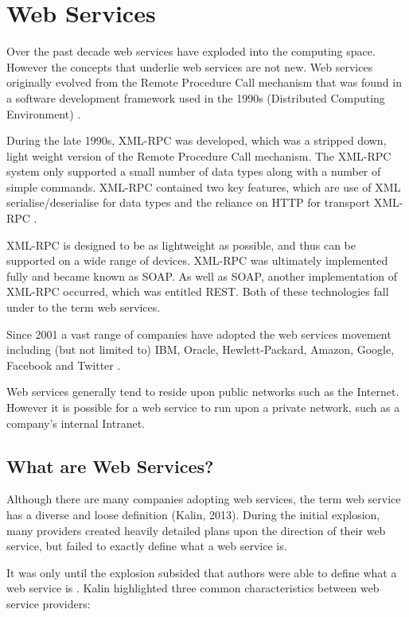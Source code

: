 \section{Web Services}

Over the past decade web services have exploded into the computing space. 
However the concepts that underlie web services are not new. Web services 
originally evolved from the Remote Procedure Call mechanism that was found in a
software development framework used in the 1990s (Distributed Computing 
Environment) \citep{kalin13}.

During the late 1990s, XML-RPC was developed, which was a stripped down, light 
weight version of the Remote Procedure Call mechanism. The XML-RPC system only 
supported a small number of data types along with a number of simple commands. 
XML-RPC contained two key features, which are use of XML serialise/deserialise 
for data types and the reliance on HTTP for transport XML-RPC \citep{kalin13}.

XML-RPC is designed to be as lightweight as possible, and thus can be supported
on a wide range of devices. XML-RPC was ultimately implemented fully and became
known as SOAP. As well as SOAP, another implementation of XML-RPC occurred, 
which was entitled REST. Both of these technologies fall under to the term web 
services.

Since 2001 a vast range of companies have adopted the web services movement 
including (but not limited to) IBM, Oracle, Hewlett-Packard, Amazon, Google, 
Facebook and Twitter \citep{sullivan01, kalin13}.

Web services generally tend to reside upon public networks such as the 
Internet. However it is possible for a web service to run upon a private 
network, such as a company’s internal Intranet. 


\newpage
\subsection{What are Web Services?}

Although there are many companies adopting web services, the term web service 
has a diverse and loose definition (Kalin, 2013). During the initial explosion, 
many providers created heavily detailed plans upon the direction of their web 
service, but failed to exactly define what a web service is.

It was only until the explosion subsided that authors were able to define what 
a web service is \citep{kalin13}. \citet{kalin13} Kalin highlighted three 
common characteristics between web service providers:


